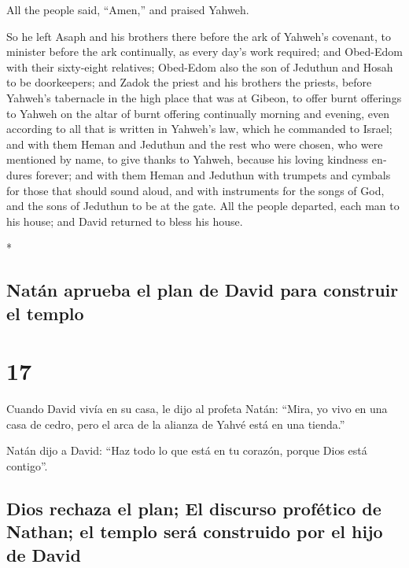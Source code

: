 \begin{paracol}{2}
\begin{otherlanguage}{english}
All the people said, ``Amen,'' and praised Yahweh.

 So he left Asaph and his brothers there before the ark
of Yahweh's covenant, to minister before the ark continually, as every
day's work required;  and Obed-Edom with their
sixty-eight relatives; Obed-Edom also the son of Jeduthun and Hosah to
be doorkeepers;  and Zadok the priest and his brothers
the priests, before Yahweh's tabernacle in the high place that was at
Gibeon,  to offer burnt offerings to Yahweh on the altar
of burnt offering continually morning and evening, even according to all
that is written in Yahweh's law, which he commanded to Israel;
 and with them Heman and Jeduthun and the rest who were
chosen, who were mentioned by name, to give thanks to Yahweh, because
his loving kindness endures forever;  and with them Heman
and Jeduthun with trumpets and cymbals for those that should sound
aloud, and with instruments for the songs of God, and the sons of
Jeduthun to be at the gate.  All the people departed,
each man to his house; and David returned to bless his house.

\end{otherlanguage}

\switchcolumn[0]*

\hypertarget{natuxe1n-aprueba-el-plan-de-david-para-construir-el-templo}{%
\subsection{Natán aprueba el plan de David para construir el
templo}\label{natuxe1n-aprueba-el-plan-de-david-para-construir-el-templo}}

\hypertarget{section-32}{%
\section{17}\label{section-32}}

 Cuando David vivía en su casa, le dijo al profeta Natán:
``Mira, yo vivo en una casa de cedro, pero el arca de la alianza de
Yahvé está en una tienda.''

 Natán dijo a David: ``Haz todo lo que está en tu corazón,
porque Dios está contigo''.

\hypertarget{dios-rechaza-el-plan-el-discurso-profuxe9tico-de-nathan-el-templo-seruxe1-construido-por-el-hijo-de-david}{%
\subsection{Dios rechaza el plan; El discurso profético de Nathan; el
templo será construido por el hijo de
David}\label{dios-rechaza-el-plan-el-discurso-profuxe9tico-de-nathan-el-templo-seruxe1-construido-por-el-hijo-de-david}}


\end{paracol}
